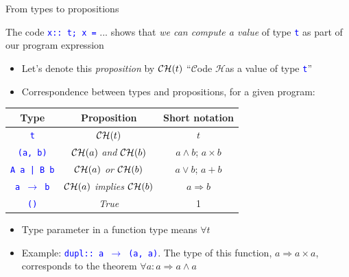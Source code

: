 \documentclass[english]{beamer}
\providecommand{\tabularnewline}{\\}
\begin{document}
\begin{frame}{From types to propositions}

The code \texttt{\textcolor{blue}{\footnotesize{}x::\ t; x =}} ...
shows that \emph{we can compute a value} of type \texttt{\textcolor{blue}{\footnotesize{}t}}
as part of our program expression
\begin{itemize}
\item Let's denote this \emph{proposition} by ${\cal CH}(t)$ \textendash{}
``$\mathcal{C}$ode $\mathcal{H}$as a value of type \texttt{\textcolor{blue}{\footnotesize{}t}}''
\item Correspondence between types and propositions, for a given program:
\end{itemize}
\begin{center}
\begin{tabular}{|c|c|c|}
\hline 
\textbf{Type} &
\textbf{Proposition} &
\textbf{Short notation}\tabularnewline
\hline 
\hline 
\texttt{\textcolor{blue}{\footnotesize{}t}} &
${\cal CH}(t)$ &
$t$\tabularnewline
\hline 
\texttt{\textcolor{blue}{\footnotesize{}(a, b)}} &
${\cal CH}(a)$ \emph{and} ${\cal CH}(b)$ &
$a\wedge b$; $a\times b$\tabularnewline
\hline 
\texttt{\textcolor{blue}{\footnotesize{}A a | B b}} &
${\cal CH}(a)$ \emph{or} ${\cal CH}(b)$ &
$a\vee b$; $a+b$\tabularnewline
\hline 
\texttt{\textcolor{blue}{\footnotesize{}a $\rightarrow$ b}} &
${\cal CH}(a)$ \emph{implies} ${\cal CH}(b)$ &
$a\Rightarrow b$\tabularnewline
\hline 
\texttt{\textcolor{blue}{\footnotesize{}()}} &
\emph{True} &
1\tabularnewline
\hline 
\end{tabular}
\par\end{center}
\begin{itemize}
\item Type parameter in a function type means $\forall t$
\item Example: \texttt{\textcolor{blue}{\footnotesize{}dupl::\ a $\rightarrow$
(a, a)}}. The type of this function, $a\Rightarrow a\times a$, corresponds
to the theorem $\forall a:a\Rightarrow a\wedge a$
\end{itemize}
\end{frame}
\end{document}
